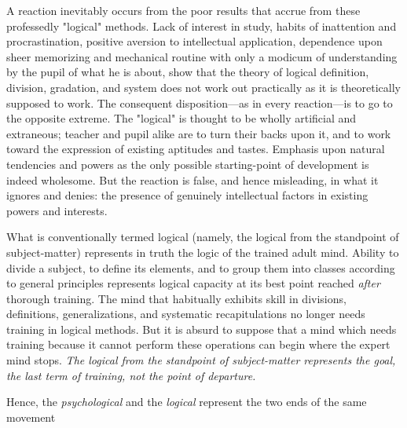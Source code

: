 \documentclass[showtrims,ustradepaper]{memoir}
\begin{document}
A reaction inevitably occurs from the poor results that accrue from
these professedly "logical" methods. Lack of interest in study, habits
of inattention and procrastination, positive aversion to intellectual
application, dependence upon sheer memorizing and mechanical routine
with only a modicum of understanding by the pupil of what he is about,
show that the theory of logical definition, division, gradation, and
system does not work out practically as it is theoretically supposed to
work. The consequent disposition---as in every reaction---is to go to
the opposite extreme. The "logical" is thought to be wholly artificial
and extraneous; teacher and pupil alike are to turn their backs upon it,
and to work toward the expression of existing aptitudes and tastes.
Emphasis upon natural tendencies and powers as the only possible
starting-point of development is indeed wholesome. But the reaction is
false, and hence misleading, in what it ignores and denies: the presence
of genuinely intellectual factors in existing powers and interests.


What is conventionally termed logical (namely, the logical from the
standpoint of subject-matter) represents in truth the logic of the
trained adult mind. Ability to divide a subject, to define its elements,
and to group them into classes according to general principles
represents logical capacity at its best point reached \emph{after}
thorough training. The mind that habitually exhibits skill in divisions,
definitions, generalizations, and systematic recapitulations no longer
needs training in logical methods. But it is absurd to suppose that a
mind which needs training because it cannot perform these
operations
can begin where the expert mind stops. \emph{The logical from the
standpoint of subject-matter represents the goal, the last term of
training, not the point of departure.}


Hence, the \emph{psychological} and the \emph{logical} represent the two
ends of the same movement
\end{document}
